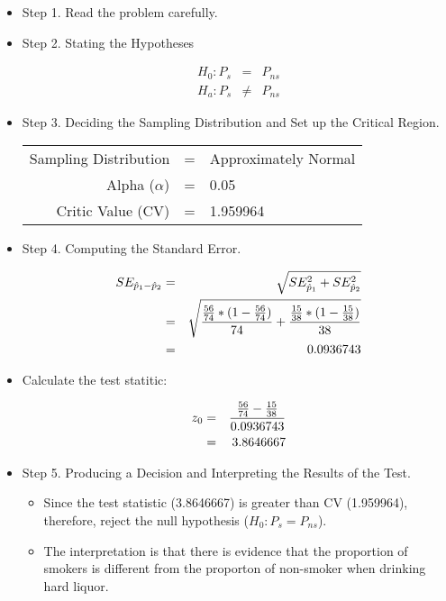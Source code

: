 \documentclass[11pt]{book}\usepackage[]{graphicx}\usepackage[]{color}
\begin{document}
\begin{itemize}
\item Step 1. Read the problem carefully.
\item Step 2. Stating the Hypotheses

\begin{eqnarray*}
H_0: P_s & = & P_{ns} \\
H_a: P_s & \ne & P_{ns}
\end{eqnarray*}

\item Step 3.  Deciding the Sampling Distribution and Set up the Critical Region.



\begin{tabular}{@{} rcl @{}}
Sampling Distribution & = & Approximately Normal \\
Alpha ($\alpha$)  & = & 0.05 \\
Critic Value (CV) & = & 1.959964
\end{tabular}

\item Step 4.  Computing the Standard Error.

\begin{eqnarray*}
    SE_{\hat{p}_1-\hat{p}_2} &=& \sqrt{SE_{\hat{p}_1}^2 + SE_{\hat{p}_2}^2} \\
             &=& \sqrt{ \frac{\frac{56}{74} *(1 - \frac{56}{74})}{74} + \frac{\frac{15}{38} *(1 - \frac{15}{38})}{38} } \\ \vspace{3mm}
             &=& 0.0936743
  \end{eqnarray*}

  \item Calculate the test statitic:

    \begin{eqnarray*}
    z_0 &=& \frac{\frac{56}{74} - \frac{15}{38}}{0.0936743} \\ \vspace{3mm}
        &=& 3.8646667
    \end{eqnarray*}

\item Step 5.  Producing a Decision and Interpreting the Results of the Test.
	\begin{itemize}
	\samepage
	\item Since the test statistic (3.8646667) is greater than CV (1.959964), therefore, reject the null hypothesis ($H_0: P_s = P_{ns}$).
	\samepage
	\item The interpretation is that there is evidence that the proportion of smokers is different from the proporton of non-smoker when drinking hard liquor.
	\end{itemize}

\end{itemize}
\end{document}
